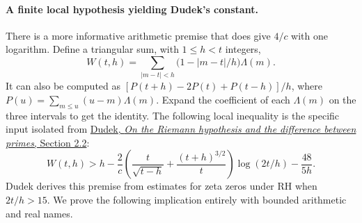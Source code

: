 \paragraph{A finite local hypothesis yielding Dudek's constant.}
There is a more informative arithmetic premise that does give $4/c$ with one logarithm. Define a triangular sum, with $1\le h<t$ integers,
\[
 W(t,h)=\sum_{|m-t|<h}\bigl(1-|m-t|/h\bigr)\Lambda(m).
\]
It can also be computed as $[P(t+h)-2P(t)+P(t-h)]/h$, where
$P(u)=\sum_{m\le u}(u-m)\Lambda(m)$. Expand the coefficient of each $\Lambda(m)$ on the three intervals to get the identity. The following local inequality is the specific input isolated from \href{https://arxiv.org/abs/1402.6417}{Dudek, \emph{On the Riemann hypothesis and the difference between primes}, Section 2.2}:
\begin{equation}\label{eq:local-triangle}
 W(t,h)>h-\frac{2}{c}\left(\frac{t}{\sqrt{t-h}}
           +\frac{(t+h)^{3/2}}{t}\right)\log(2t/h)-\frac{48}{5h}.
\end{equation}
Dudek derives this premise from estimates for zeta zeros under RH when $2t/h>15$. We prove the following implication entirely with bounded arithmetic and real names.

